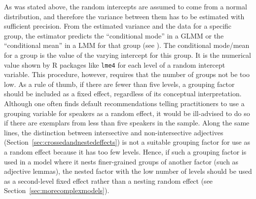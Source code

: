 As was stated above, the random intercepts are assumed to come from a normal distribution, and therefore the variance between them has to be estimated with sufficient precision.
From the estimated variance and the data for a specific group, the estimator predicts the ``conditional mode'' in a GLMM or the ``conditional mean'' in a LMM for that group (see \citealt[Ch.~1]{Bates2010}).
The conditional mode\slash mean for a group is the value of the varying intercept for this group.
It is the numerical value shown by R packages like \texttt{lme4} for each level of a random intercept variable.
This procedure, however, requires that the number of groups not be too low.
As a rule of thumb, if there are fewer than five levels, a grouping factor should be included as a fixed effect, regardless of its conceptual interpretation.
Although one often finds default recommendations telling practitioners to use a grouping variable for speakers as a random effect, it would be ill-advised to do so if there are exemplars from less than five speakers in the sample.
Along the same lines, the distinction between intersective and non-intersective adjectives (Section~\ref{sec:crossedandnestedeffects}) is not a suitable grouping factor for use as a random effect because it has too few levels.
Hence, if such a grouping factor is used in a model where it nests finer-grained groups of another factor (such as adjective lemmas), the nested factor with the low number of levels should be used as a second-level fixed effect rather than a nesting random effect (see Section~\ref{sec:morecomplexmodels}).

